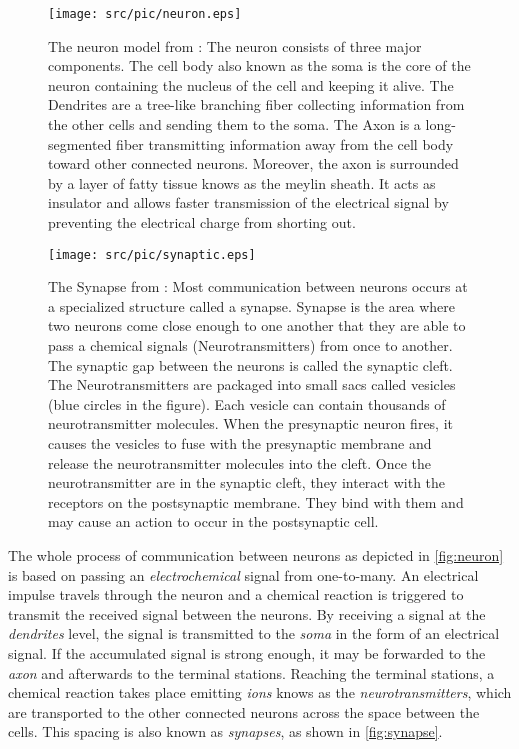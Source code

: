 \begin{figure}[ht!]
  \centering
  \texttt{[image: src/pic/neuron.eps]}
  \caption{The neuron model from \citep{introductiontopsychology}: The neuron consists of three major components. The cell body also
  known as the soma is the core of the neuron containing the nucleus of the cell and keeping
  it alive. The Dendrites are a tree-like branching fiber collecting information from the other
  cells and sending them to the soma. The Axon is a long-segmented fiber transmitting
  information away from the cell body toward other connected neurons. Moreover, the axon
  is surrounded by a layer of fatty tissue knows as the meylin sheath. It acts as insulator and
  allows faster transmission of the electrical signal by preventing the electrical charge from
  shorting out.}
  \label{fig:neuron}
\end{figure}


\begin{figure}[ht!]
  \centering
  \texttt{[image: src/pic/synaptic.eps]}
  \caption{The Synapse from \citep{Neurotransmitters}: Most communication between neurons occurs at a specialized structure called a synapse. Synapse is the area where two neurons come close enough to one another that they are able to pass a chemical signals (Neurotransmitters) from once to another. The synaptic gap between the neurons is called the synaptic cleft. The Neurotransmitters are packaged into small sacs called vesicles (blue circles in the figure). Each vesicle can contain thousands of neurotransmitter molecules. When the presynaptic neuron fires, it causes the vesicles to fuse with the presynaptic membrane and release the neurotransmitter molecules into the cleft. Once the neurotransmitter are in the synaptic cleft, they interact with the receptors on the postsynaptic membrane. They bind with them and may cause an action to occur in the postsynaptic cell.}
  \label{fig:synapse}
\end{figure}


The whole process of communication between neurons as depicted in \autoref{fig:neuron} is based on passing an \emph{electrochemical} signal from one-to-many. An electrical impulse travels through the neuron and a chemical reaction is triggered to transmit the received signal between the neurons. By receiving a signal at the \emph{dendrites} level, the signal is transmitted to the \emph{soma} in the form of an electrical signal. If the accumulated signal is strong enough, it may be forwarded to the \emph{axon} and afterwards to the terminal stations. Reaching the terminal stations, a chemical reaction takes place emitting \emph{ions} knows as the \emph{neurotransmitters}, which are transported to the other connected neurons across the space between the cells. This spacing is also known as \emph{synapses}, as shown in \autoref{fig:synapse}. 

